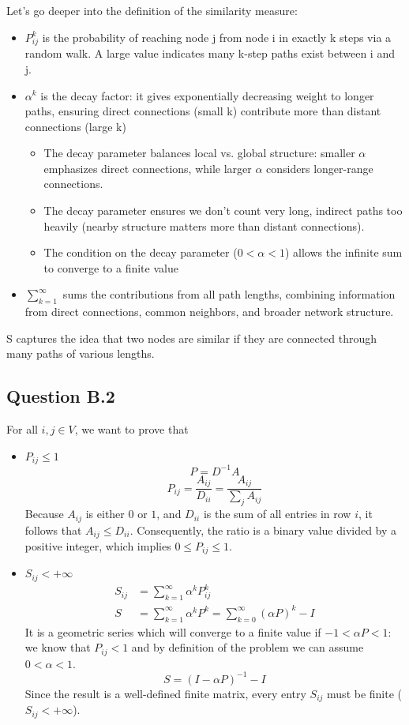 \documentclass[a4paper]{scrartcl}
\begin{document}
Let's go deeper into the definition of the similarity measure:
\begin{itemize}
\item $P_{ij}^k$ is the probability of reaching node j from node i in exactly k steps via a random walk. A large value indicates many k-step paths exist between i and j.

\item $\alpha^k$ is the decay factor: it gives exponentially decreasing weight to longer paths, ensuring direct connections (small k) contribute more than distant connections (large k)
\begin{itemize}
\item The decay parameter balances local vs. global structure: smaller $\alpha$ emphasizes direct connections, while larger $\alpha$ considers longer-range connections.
\item The decay parameter ensures we don't count very long, indirect paths too heavily (nearby structure matters more than distant connections).
\item The condition on the decay parameter ($0 < \alpha < 1$) allows the infinite sum to converge to a finite value
\end{itemize}

\item $\sum_{k=1}^{\infty}$ sums the contributions from all path lengths, combining information from direct connections, common neighbors, and broader network structure.
\end{itemize}

S captures the idea that two nodes are similar if they are connected through many paths of various lengths.

\subsection*{Question B.2}
For all $i,j \in V$, we want to prove that 
\begin{itemize}
    \item $P_{ij} \leq 1$\\
\[
P = D^{-1} A 
\] 
\[
P_{ij} = \frac{A_{ij}}{D_{ii}} = \frac{A_{ij}}{\sum_{j} A_{ij}}
\]
Because $A_{ij}$ is either $0$ or $1$, and $D_{ii}$ is the sum of all entries in row $i$, it follows that $A_{ij} \leq D_{ii}$. Consequently, the ratio is a binary value divided by a positive integer, which implies $0 \leq P_{ij} \leq 1$.
    \item $S_{ij} < + \infty$\\
\begin{align*}
    S_{ij} &= \sum_{k=1}^{\infty} \alpha^k P_{ij}^k\\
    S &= \sum_{k=1}^{\infty} \alpha^k P^k
    = \sum_{k=0}^{\infty} (\alpha P)^k - I
\end{align*}
It is a geometric series which will converge to a finite value if $-1 <\alpha P < 1$: we know that $P_{ij} < 1$ and by definition of the problem we can assume $0 < \alpha < 1$. 
\[
S = (I-\alpha P)^{-1} - I
\]
Since the result is a well-defined finite matrix, every entry $S_{ij}$ must be finite ($S_{ij} < +\infty$).
\end{itemize}
\end{document}
